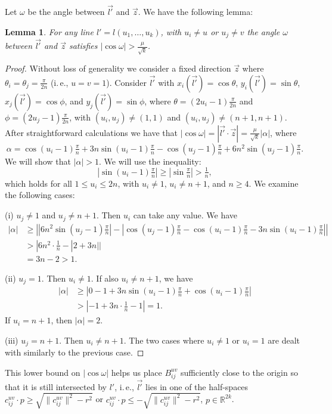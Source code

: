 \documentclass[12pt]{article}
\newtheorem{lemma}[definition]{Lemma}
\newcommand{\R}{\mathbb{R}}
\begin{document}
Let $\omega$ 
be the angle between $\vec{l'}$ and $\vec{z}$. 
We have the following lemma: 
\begin{lemma}
\label{omega_bound}
For any line $l'=l(u_1,\ldots,u_k)$, with $u_i\neq u$ or $u_j\neq v$ the angle $\omega$ 
between $\vec{l'}$ and $\vec{z}$ satisfies $|\cos\omega|>\frac{\mu}{\sqrt{k}}$.
\end{lemma}
\begin{proof}
Without loss of generality we consider a fixed direction $\vec{z}$ where $\theta_i=\theta_j=\frac{\pi}{2n}$ (i.\,e., $u=v=1$).
Consider $\vec{l'}$ with $x_i(\vec{l'})=\cos\theta$, $y_i(\vec{l'})=\sin\theta$, $x_j(\vec{l'})=\cos\phi$, and 
$y_j(\vec{l'})=\sin\phi$, where $\theta=(2u_i-1)\frac{\pi}{2n}$ and $\phi=(2u_j-1)\frac{\pi}{2n}$, with $(u_i,u_j)\neq (1,1)$ and 
$(u_i,u_j)\neq (n+1, n+1)$. After straightforward calculations we have that
$|\cos\omega|=|\vec{l'}\cdot\vec{z}|=\frac{\mu}{\sqrt{k}}|\alpha|$, where 
$$\alpha=\cos(u_i-1)\tfrac{\pi}{n} + 3n\sin(u_i-1)\tfrac{\pi}{n} - \cos(u_j-1)\tfrac{\pi}{n} + 6n^2\sin(u_j-1)\tfrac{\pi}{n}.$$
We will show that $|\alpha|>1$. We will use the inequality:
$$|\sin(u_i-1)\tfrac{\pi}{n}|\geq|\sin\tfrac{\pi}{n}|>\tfrac{1}{n},$$
which holds for all $1\leq u_i\leq 2n$, with $u_i\neq 1$, $u_i\neq n+1$, and $n\geq 4$.
We examine the following cases:

(i) $u_j\neq 1$ and $u_j\neq n+1$. Then $u_i$ can take any value.
We have 
\begin{align*}
|\alpha| &\geq
\left||6n^2\sin(u_j-1)\frac{\pi}{n}|-|\cos(u_j-1)\frac{\pi}{n} - \cos(u_i-1)\frac{\pi}{n} - 3n\sin(u_i-1)\frac{\pi}{n}|\right|
\\&
>|6n^2\cdot \tfrac{1}{n} - |2+3n||
\\&
=3n-2 > 1.
\end{align*}

(ii) $u_j=1$. Then $u_i\neq 1$. If also $u_i\neq n+1$, we have
\begin{align*}
|\alpha| &\geq
|0-1+3n\sin(u_i-1)\frac{\pi}{n} + \cos(u_i-1)\frac{\pi}{n}|
\\&
>|-1+3n\cdot \frac{1}{n}-1| = 1.
\end{align*} 
If $u_i=n+1$, then $|\alpha|=2$.

(iii) $u_j=n+1$. Then $u_i\neq n+1$. The two cases where $u_i\neq 1$ or $u_i=1$ are dealt with similarly to the previous case.
\end{proof}
This lower bound on $|\cos\omega|$ helps us 
place $B_{ij}^{uv}$ sufficiently close to the origin so that it is still intersected by $l'$, i.\,e., 
$\vec{l'}$ lies in one of the half-spaces 
$c_{ij}^{uv}\cdot p\geq \sqrt{\lVert c_{ij}^{uv}\rVert^2-r^2}$ or $c_{ij}^{uv}\cdot p\leq -\sqrt{\lVert c_{ij}^{uv}\rVert^2-r^2}$, 
$p\in\R^{2k}$.
\end{document}
